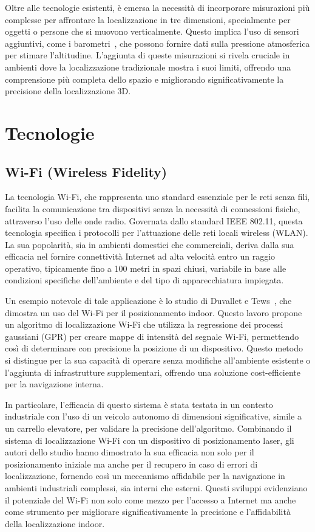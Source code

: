 Oltre alle tecnologie esistenti, è emersa la necessità di incorporare misurazioni più complesse per affrontare la localizzazione in tre dimensioni, specialmente per oggetti o persone che si muovono verticalmente. Questo implica l'uso di sensori aggiuntivi, come i barometri~\cite{bisio_wifi_barometer_2018}, che possono fornire dati sulla pressione atmosferica per stimare l'altitudine. L'aggiunta di queste misurazioni si rivela cruciale in ambienti dove la localizzazione tradizionale mostra i suoi limiti, offrendo una comprensione più completa dello spazio e migliorando significativamente la precisione della localizzazione 3D.

\section{Tecnologie}
\subsection{Wi-Fi (Wireless Fidelity)}
\hspace{\parindent}La tecnologia Wi-Fi, che rappresenta uno standard essenziale per le reti senza fili, facilita la comunicazione tra dispositivi senza la necessità di connessioni fisiche, attraverso l'uso delle onde radio. Governata dallo standard IEEE 802.11, questa tecnologia specifica i protocolli per l'attuazione delle reti locali wireless (WLAN). La sua popolarità, sia in ambienti domestici che commerciali, deriva dalla sua efficacia nel fornire connettività Internet ad alta velocità entro un raggio operativo, tipicamente fino a 100 metri in spazi chiusi, variabile in base alle condizioni specifiche dell'ambiente e del tipo di apparecchiatura impiegata.

\noindent Un esempio notevole di tale applicazione è lo studio di Duvallet e Tews~\cite{duvallet_wifi_position_2008}, che dimostra un uso del Wi-Fi per il posizionamento indoor. Questo lavoro propone un algoritmo di localizzazione Wi-Fi che utilizza la regressione dei processi gaussiani (GPR) per creare mappe di intensità del segnale Wi-Fi, permettendo così di determinare con precisione la posizione di un dispositivo. Questo metodo si distingue per la sua capacità di operare senza modifiche all'ambiente esistente o l'aggiunta di infrastrutture supplementari, offrendo una soluzione cost-efficiente per la navigazione interna.

In particolare, l'efficacia di questo sistema è stata testata in un contesto industriale con l'uso di un veicolo autonomo di dimensioni significative, simile a un carrello elevatore, per validare la precisione dell'algoritmo. Combinando il sistema di localizzazione Wi-Fi con un dispositivo di posizionamento laser, gli autori dello studio hanno dimostrato la sua efficacia non solo per il posizionamento iniziale ma anche per il recupero in caso di errori di localizzazione, fornendo così un meccanismo affidabile per la navigazione in ambienti industriali complessi, sia interni che esterni. Questi sviluppi evidenziano il potenziale del Wi-Fi non solo come mezzo per l'accesso a Internet ma anche come strumento per migliorare significativamente la precisione e l'affidabilità della localizzazione indoor.

